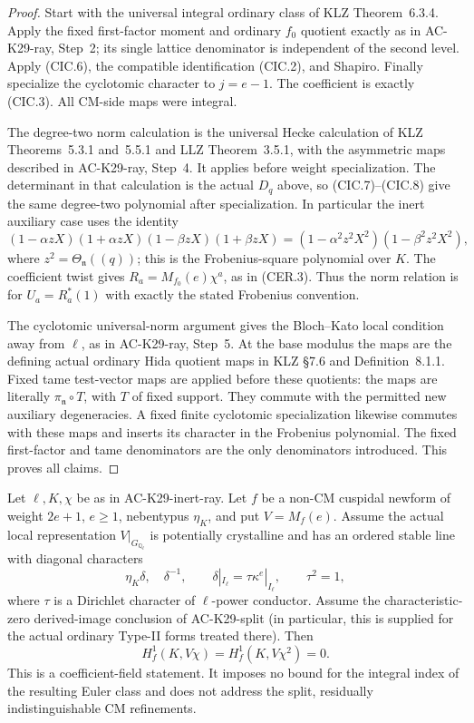 \begin{proof}
Start with the universal integral ordinary class of KLZ
Theorem~6.3.4.  Apply the fixed first-factor moment and
ordinary $f_0$ quotient exactly as in AC-K29-ray,
Step~2; its single lattice denominator is independent of
the second level.  Apply (CIC.6), the compatible
identification (CIC.2), and Shapiro.  Finally specialize
the cyclotomic character to $j=e-1$.  The coefficient is
exactly (CIC.3).  All CM-side maps were integral.

The degree-two norm calculation is the universal Hecke
calculation of KLZ Theorems~5.3.1 and~5.5.1 and LLZ
Theorem~3.5.1, with the asymmetric maps described in
AC-K29-ray, Step~4.  It applies before weight
specialization.  The determinant in that calculation is
the actual $D_q$ above, so (CIC.7)--(CIC.8) give the
same degree-two polynomial after specialization.  In
particular the inert auxiliary case uses the identity
\[
 (1-\alpha zX)(1+\alpha zX)
 (1-\beta zX)(1+\beta zX)
 =(1-\alpha^2z^2X^2)(1-\beta^2z^2X^2),                 \tag{CIC.9}
\]
where $z^2=\Theta_{\mathfrak n}((q))$; this is the
Frobenius-square polynomial over $K$.  The coefficient
twist gives $R_a=M_{f_0}(e)\chi^a$, as in (CER.3).
Thus the norm relation is for $U_a=R_a^*(1)$ with
exactly the stated Frobenius convention.

The cyclotomic universal-norm argument gives the
Bloch--Kato local condition away from $\ell$, as in
AC-K29-ray, Step~5.  At the base modulus the maps are
the defining actual ordinary Hida quotient maps in KLZ
\S7.6 and Definition~8.1.1.  Fixed tame test-vector
maps are applied before these quotients: the maps are
literally $\pi_{\mathfrak n}\circ T$, with $T$ of
fixed support.  They commute with the permitted new
auxiliary degeneracies.  A fixed finite cyclotomic
specialization likewise commutes with these maps and
inserts its character in the Frobenius polynomial.
The fixed first-factor and tame denominators are the
only denominators introduced.  This proves all claims.
\end{proof}

\begin{theorem}
\label{AC-K29-inert}
Let $\ell,K,\chi$ be as in AC-K29-inert-ray.  Let $f$ be
a non-CM cuspidal newform of weight $2e+1$, $e\ge1$,
nebentypus $\eta_K$, and put $V=M_f(e)$.  Assume the
actual local representation $V|_{G_{\mathbb Q_\ell}}$
is potentially crystalline and has an ordered stable
line with diagonal characters
\[
       \eta_K\delta,\quad\delta^{-1},\qquad
       \delta|_{I_\ell}=\tau\kappa^e|_{I_\ell},
       \qquad \tau^2=1,                                \tag{CIC.10}
\]
where $\tau$ is a Dirichlet character of $\ell$-power
conductor.  Assume the characteristic-zero derived-image
conclusion of AC-K29-split (in particular, this is
supplied for the actual ordinary Type-II forms treated
there).  Then
\[
        H_f^1(K,V\chi)=H_f^1(K,V\chi^2)=0.             \tag{CIC.11}
\]
This is a coefficient-field statement.  It imposes no
bound for the integral index of the resulting Euler
class and does not address the split, residually
indistinguishable CM refinements.
\end{theorem}

